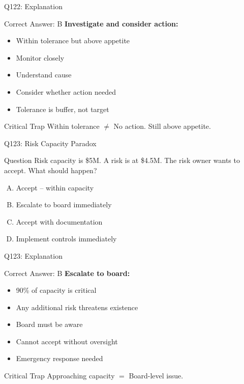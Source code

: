 \documentclass{beamer}
\begin{document}
	\begin{frame}{Q122: Explanation}
		\begin{block}{Correct Answer: B}
			\textbf{Investigate and consider action:}
			\begin{itemize}
				\item Within tolerance but above appetite
				\item Monitor closely
				\item Understand cause
				\item Consider whether action needed
				\item Tolerance is buffer, not target
			\end{itemize}
		\end{block}
		\begin{alertblock}{Critical Trap}
			Within tolerance $\neq$ No action. Still above appetite.
		\end{alertblock}
	\end{frame}
	
	\begin{frame}{Q123: Risk Capacity Paradox}
		\begin{block}{Question}
			Risk capacity is \$5M. A risk is at \$4.5M. The risk owner wants to accept. What should happen?
		\end{block}
		\begin{enumerate}[(A)]
			\item Accept -- within capacity
			\item Escalate to board immediately
			\item Accept with documentation
			\item Implement controls immediately
		\end{enumerate}
	\end{frame}
	
	\begin{frame}{Q123: Explanation}
		\begin{block}{Correct Answer: B}
			\textbf{Escalate to board:}
			\begin{itemize}
				\item 90\% of capacity is critical
				\item Any additional risk threatens existence
				\item Board must be aware
				\item Cannot accept without oversight
				\item Emergency response needed
			\end{itemize}
		\end{block}
		\begin{alertblock}{Critical Trap}
			Approaching capacity $=$ Board-level issue.
		\end{alertblock}
	\end{frame}
	
\end{document}
